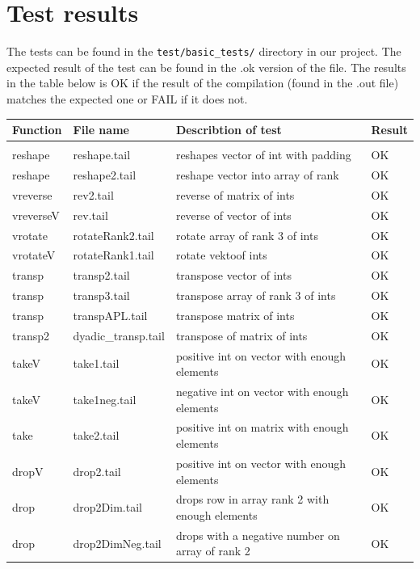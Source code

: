 \documentclass[11pt]{article}
\begin{document}
\newpage

\section{Test results}
\label{app:testresults}
The tests can be found in the {\tt test/basic\_tests/} directory in our project.
The expected result of the test can be found in the .ok version of the file. The results in the table below is OK if the result of the compilation (found in the .out file) matches the expected one or FAIL if it does not.

\begin{center}
\begin{tabular}{l l l l}
Function  		& File name		& Describtion of test						& Result \\ \hline \\
reshape		&  reshape.tail		& reshapes vector of int with padding			& OK \\
reshape 		& reshape2.tail	 	& reshape vector into array of rank 			& OK \\ 
vreverse		& rev2.tail			& reverse of matrix of ints					& OK \\
vreverseV		& rev.tail			& reverse of vector of ints					& OK \\
vrotate		& rotateRank2.tail	& rotate array of rank 3 of ints				& OK \\
vrotateV		& rotateRank1.tail	& rotate vektoof ints 						& OK \\
transp		& transp2.tail		& transpose vector of ints					& OK \\
transp 		& transp3.tail		& transpose array of rank 3 of ints			& OK \\ 
transp 		& transpAPL.tail		& transpose matrix of ints					& OK \\	
transp2		& dyadic\_transp.tail	& transpose of matrix of ints				& OK \\
takeV		& take1.tail		& positive int on vector with enough elements 	& OK \\ 
takeV		& take1neg.tail		& negative int on vector with enough elements	& OK \\ 
take			& take2.tail		& positive int on matrix with enough elements 	& OK \\
dropV		& drop2.tail		& positive int on vector with enough elements	& OK \\
drop			& drop2Dim.tail	    	& drops row in array rank 2 with enough elements & OK \\
drop 			& drop2DimNeg.tail 	& drops with a negative number on array of rank 2 & OK \\

\end{tabular}
\end{center}
\end{document}

